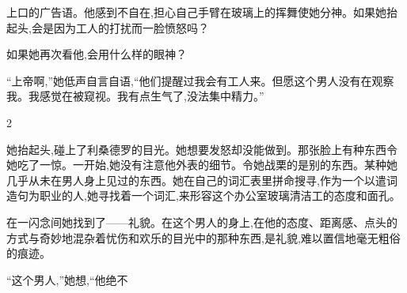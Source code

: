 \documentclass{ctexart}
\renewcommand{\\}{\par}
\begin{document}
上口的广告语。他感到不自在,担心自己手臂在玻璃上的挥舞使她分神。如果她抬起头,会是因为工人的打扰而一脸愤怒吗？ \\如果她再次看他,会用什么样的眼神？ \\``上帝啊,''她低声自言自语,``他们提醒过我会有工人来。但愿这个男人没有在观察我。我感觉在被窥视。我有点生气了,没法集中精力。'' \\ \begin{center} 2 \end{center} \\她抬起头,碰上了利桑德罗的目光。她想要发怒却没能做到。那张脸上有种东西令她吃了一惊。一开始,她没有注意他外表的细节。令她战栗的是别的东西。某种她几乎从未在男人身上见过的东西。她在自己的词汇表里拼命搜寻,作为一个以遣词造句为职业的人,她寻找着一个词汇,来形容这个办公室玻璃清洁工的态度和面孔。\\在一闪念间她找到了——礼貌。在这个男人的身上,在他的态度、距离感、点头的方式与奇妙地混杂着忧伤和欢乐的目光中的那种东西,是礼貌,难以置信地毫无粗俗的痕迹。 \\“这个男人,”她想,“他绝不
\end{document}
